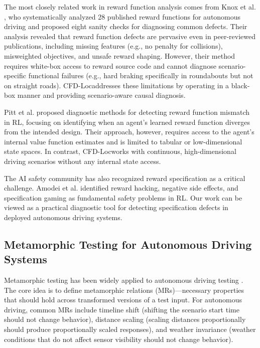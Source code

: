 \documentclass[conference]{IEEEtran}
\theoremstyle{plain}
\newcommand{\methodname}{CFD-Loc}
\begin{document}
The most closely related work in reward function analysis comes from Knox et al. \cite{knox2023reward}, who systematically analyzed 28 published reward functions for autonomous driving and proposed eight sanity checks for diagnosing common defects. Their analysis revealed that reward function defects are pervasive even in peer-reviewed publications, including missing features (e.g., no penalty for collisions), misweighted objectives, and unsafe reward shaping. However, their method requires white-box access to reward source code and cannot diagnose scenario-specific functional failures (e.g., hard braking specifically in roundabouts but not on straight roads). \methodname addresses these limitations by operating in a black-box manner and providing scenario-aware causal diagnosis.

Pitt et al. \cite{pitt2018diagnosis} proposed diagnostic methods for detecting reward function mismatch in RL, focusing on identifying when an agent's learned reward function diverges from the intended design. Their approach, however, requires access to the agent's internal value function estimates and is limited to tabular or low-dimensional state spaces. In contrast, \methodname works with continuous, high-dimensional driving scenarios without any internal state access.

The AI safety community has also recognized reward specification as a critical challenge. Amodei et al. \cite{amodei2016specification} identified reward hacking, negative side effects, and specification gaming as fundamental safety problems in RL. Our work can be viewed as a practical diagnostic tool for detecting specification defects in deployed autonomous driving systems.

\subsection{Metamorphic Testing for Autonomous Driving Systems}

Metamorphic testing has been widely applied to autonomous driving testing \cite{deng2023rmt}. The core idea is to define metamorphic relations (MRs)---necessary properties that should hold across transformed versions of a test input. For autonomous driving, common MRs include timeline shift (shifting the scenario start time should not change behavior), distance scaling (scaling distances proportionally should produce proportionally scaled responses), and weather invariance (weather conditions that do not affect sensor visibility should not change behavior).
\end{document}
